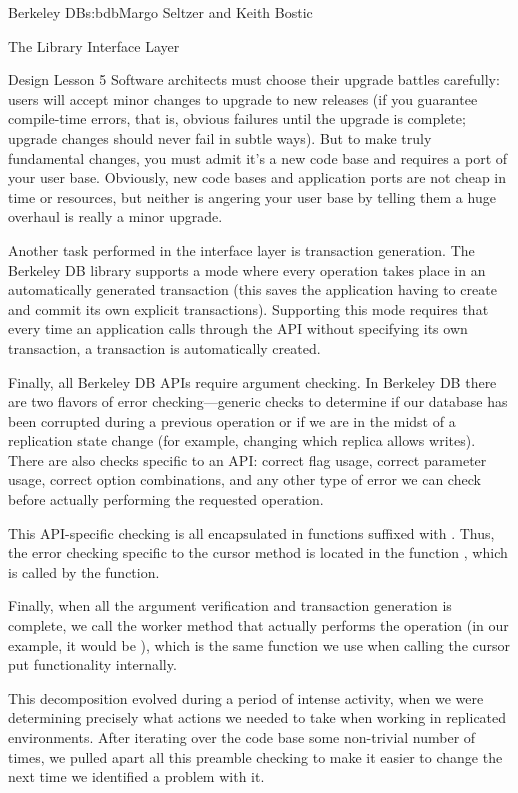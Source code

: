 \begin{aosachapter}{Berkeley DB}{s:bdb}{Margo Seltzer and Keith Bostic}
\begin{aosasect1}{The Library Interface Layer}
\begin{aosabox}{Design Lesson 5}
Software architects must choose their upgrade battles carefully: users
will accept minor changes to upgrade to new releases (if you guarantee
compile-time errors, that is, obvious failures until the upgrade is
complete; upgrade changes should never fail in subtle ways). But to
make truly fundamental changes, you must admit it's a new code base
and requires a port of your user base. Obviously, new code bases and
application ports are not cheap in time or resources, but neither is
angering your user base by telling them a huge overhaul is really a
minor upgrade.

\end{aosabox}

Another task performed in the interface layer is transaction
generation.  The Berkeley DB library supports a mode where every
operation takes place in an automatically generated transaction (this
saves the application having to create and commit its own explicit
transactions). Supporting this mode requires that every time an
application calls through the API without specifying its own
transaction, a transaction is automatically created.

Finally, all Berkeley DB APIs require argument checking. In Berkeley
DB there are two flavors of error checking---generic checks to
determine if our database has been corrupted during a previous
operation or if we are in the midst of a replication state change (for
example, changing which replica allows writes). There are also checks
specific to an API: correct flag usage, correct parameter usage,
correct option combinations, and any other type of error we can check
before actually performing the requested operation.

This API-specific checking is all encapsulated in functions suffixed
with . Thus, the error checking specific to the cursor
 method is located in the function ,
which is called by the  function.

Finally, when all the argument verification and transaction generation
is complete, we call the worker method that actually performs the
operation (in our example, it would be ), which is
the same function we use when calling the cursor put functionality
internally.

This decomposition evolved during a period of intense activity, when
we were determining precisely what actions we needed to take when
working in replicated environments. After iterating over the code base
some non-trivial number of times, we pulled apart all this preamble
checking to make it easier to change the next time we identified a
problem with it.


\end{aosasect1}
\end{aosachapter}
